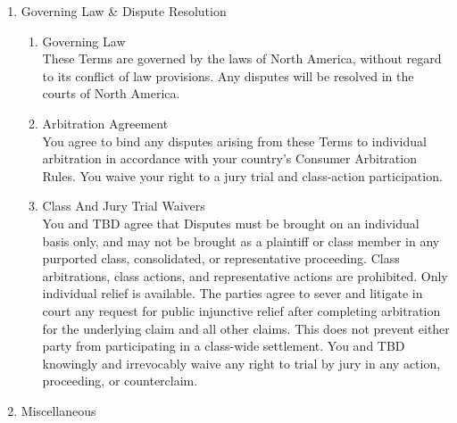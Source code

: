 \documentclass{standalone}
\begin{document}
\begin{enumerate}[label=\arabic*., noitemsep,leftmargin=*]
\begin{enumerate}[label*=\arabic*., noitemsep,leftmargin=*]
\begin{itemize}[noitemsep,leftmargin=*]
				\item [-] The accuracy, reliability, or completeness of the Service or Data.
				\item [-] The fitness for a particular purpose.
				\item [-] The absence of errors or defects.
				\item [-] The security or privacy of your Data.
				\item [-] We do not control third-party Content and are not responsible for its accuracy, legality, or harmful effects.
				\item [-] The use of the Service may be restricted or unavailable due to maintenance, updates, or other factors beyond our control.
			\end{itemize}
		\end{enumerate}
		\item Governing Law \& Dispute Resolution
		\begin{enumerate}[label*=\arabic*., noitemsep,leftmargin=*]
			\item Governing Law\\
			These Terms are governed by the laws of North America, without regard to its conflict of law provisions. Any disputes will be resolved in the courts of North America.
			\item Arbitration Agreement\\
			You agree to bind any disputes arising from these Terms to individual arbitration in accordance with your country's Consumer Arbitration Rules. You waive your right to a jury trial and class-action participation.
			\item Class And Jury Trial Waivers\\
			You and TBD agree that Disputes must be brought on an individual basis only, and may not be brought as a plaintiff or class member in any purported class, consolidated, or representative proceeding. Class arbitrations, class actions, and representative actions are prohibited. Only individual relief is available. The parties agree to sever and litigate in court any request for public injunctive relief after completing arbitration for the underlying claim and all other claims. This does not prevent either party from participating in a class-wide settlement. You and TBD knowingly and irrevocably waive any right to trial by jury in any action, proceeding, or counterclaim. 
		\end{enumerate}
		\item Miscellaneous
		\begin{enumerate}[label*=\arabic*., noitemsep,leftmargin=*]

\end{enumerate}
\end{enumerate}
\end{document}
